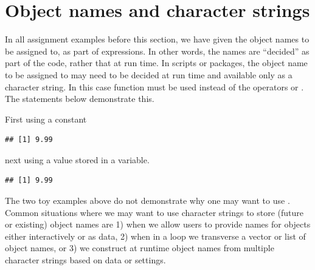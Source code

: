 \documentclass[krantz2]{krantz}\usepackage{knitr}%
\begin{document}
\section{Object names and character strings}

In all assignment examples before this section, we have given the object names to be assigned to, as part of expressions. In other words, the names are ``decided'' as part of the code, rather that at run time. In scripts or packages, the object name to be assigned to may need to be decided at run time and available only as a character string. In this case function  must be used instead of the operators \code{<-} or \code{->}. The statements below demonstrate this.

First using a  constant
\begin{knitrout}\footnotesize
{}\color{fgcolor}\begin{kframe}
\begin{alltt}
\hlstd{(}\hlstd{,} \hlstd{)}
\end{alltt}
\begin{verbatim}
## [1] 9.99
\end{verbatim}
\end{kframe}
\end{knitrout}
next using a  value stored in a variable.
\begin{knitrout}\footnotesize
{}\color{fgcolor}\begin{kframe}
\begin{alltt}
 \hlkwb{<-} 
 \hlstd{)}
\end{alltt}
\begin{verbatim}
## [1] 9.99
\end{verbatim}
\end{kframe}
\end{knitrout}

The two toy examples above do not demonstrate why one may want to use . Common situations where we may want to use character strings to store (future or existing) object names are 1) when we allow users to provide names for objects either interactively or as  data, 2) when in a loop we transverse a vector or list of object names, or 3) we construct at runtime object names from multiple character strings based on data or settings.
\end{document}
